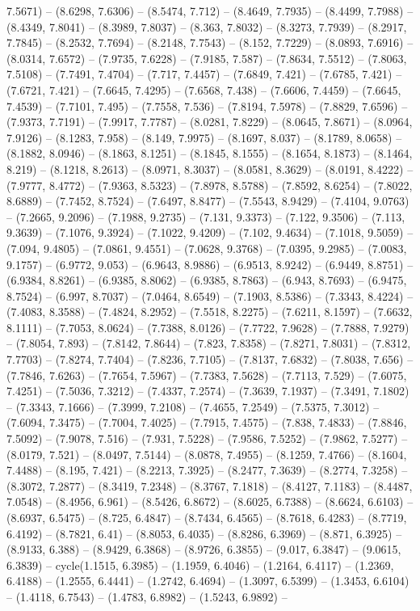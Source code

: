 7.5671) -- (8.6298, 7.6306) -- (8.5474, 7.712) -- (8.4649, 7.7935) -- (8.4499, 7.7988) -- (8.4349, 7.8041) -- (8.3989, 7.8037) -- (8.363, 7.8032) -- (8.3273, 7.7939) -- (8.2917, 7.7845) -- (8.2532, 7.7694) -- (8.2148, 7.7543) -- (8.152, 7.7229) -- (8.0893, 7.6916) -- (8.0314, 7.6572) -- (7.9735, 7.6228) -- (7.9185, 7.587) -- (7.8634, 7.5512) -- (7.8063, 7.5108) -- (7.7491, 7.4704) -- (7.717, 7.4457) -- (7.6849, 7.421) -- (7.6785, 7.421) -- (7.6721, 7.421) -- (7.6645, 7.4295) -- (7.6568, 7.438) -- (7.6606, 7.4459) -- (7.6645, 7.4539) -- (7.7101, 7.495) -- (7.7558, 7.536) -- (7.8194, 7.5978) -- (7.8829, 7.6596) -- (7.9373, 7.7191) -- (7.9917, 7.7787) -- (8.0281, 7.8229) -- (8.0645, 7.8671) -- (8.0964, 7.9126) -- (8.1283, 7.958) -- (8.149, 7.9975) -- (8.1697, 8.037) -- (8.1789, 8.0658) -- (8.1882, 8.0946) -- (8.1863, 8.1251) -- (8.1845, 8.1555) -- (8.1654, 8.1873) -- (8.1464, 8.219) -- (8.1218, 8.2613) -- (8.0971, 8.3037) -- (8.0581, 8.3629) -- (8.0191, 8.4222) -- (7.9777, 8.4772) -- (7.9363, 8.5323) -- (7.8978, 8.5788) -- (7.8592, 8.6254) -- (7.8022, 8.6889) -- (7.7452, 8.7524) -- (7.6497, 8.8477) -- (7.5543, 8.9429) -- (7.4104, 9.0763) -- (7.2665, 9.2096) -- (7.1988, 9.2735) -- (7.131, 9.3373) -- (7.122, 9.3506) -- (7.113, 9.3639) -- (7.1076, 9.3924) -- (7.1022, 9.4209) -- (7.102, 9.4634) -- (7.1018, 9.5059) -- (7.094, 9.4805) -- (7.0861, 9.4551) -- (7.0628, 9.3768) -- (7.0395, 9.2985) -- (7.0083, 9.1757) -- (6.9772, 9.053) -- (6.9643, 8.9886) -- (6.9513, 8.9242) -- (6.9449, 8.8751) -- (6.9384, 8.8261) -- (6.9385, 8.8062) -- (6.9385, 8.7863) -- (6.943, 8.7693) -- (6.9475, 8.7524) -- (6.997, 8.7037) -- (7.0464, 8.6549) -- (7.1903, 8.5386) -- (7.3343, 8.4224) -- (7.4083, 8.3588) -- (7.4824, 8.2952) -- (7.5518, 8.2275) -- (7.6211, 8.1597) -- (7.6632, 8.1111) -- (7.7053, 8.0624) -- (7.7388, 8.0126) -- (7.7722, 7.9628) -- (7.7888, 7.9279) -- (7.8054, 7.893) -- (7.8142, 7.8644) -- (7.823, 7.8358) -- (7.8271, 7.8031) -- (7.8312, 7.7703) -- (7.8274, 7.7404) -- (7.8236, 7.7105) -- (7.8137, 7.6832) -- (7.8038, 7.656) -- (7.7846, 7.6263) -- (7.7654, 7.5967) -- (7.7383, 7.5628) -- (7.7113, 7.529) -- (7.6075, 7.4251) -- (7.5036, 7.3212) -- (7.4337, 7.2574) -- (7.3639, 7.1937) -- (7.3491, 7.1802) -- (7.3343, 7.1666) -- (7.3999, 7.2108) -- (7.4655, 7.2549) -- (7.5375, 7.3012) -- (7.6094, 7.3475) -- (7.7004, 7.4025) -- (7.7915, 7.4575) -- (7.838, 7.4833) -- (7.8846, 7.5092) -- (7.9078, 7.516) -- (7.931, 7.5228) -- (7.9586, 7.5252) -- (7.9862, 7.5277) -- (8.0179, 7.521) -- (8.0497, 7.5144) -- (8.0878, 7.4955) -- (8.1259, 7.4766) -- (8.1604, 7.4488) -- (8.195, 7.421) -- (8.2213, 7.3925) -- (8.2477, 7.3639) -- (8.2774, 7.3258) -- (8.3072, 7.2877) -- (8.3419, 7.2348) -- (8.3767, 7.1818) -- (8.4127, 7.1183) -- (8.4487, 7.0548) -- (8.4956, 6.961) -- (8.5426, 6.8672) -- (8.6025, 6.7388) -- (8.6624, 6.6103) -- (8.6937, 6.5475) -- (8.725, 6.4847) -- (8.7434, 6.4565) -- (8.7618, 6.4283) -- (8.7719, 6.4192) -- (8.7821, 6.41) -- (8.8053, 6.4035) -- (8.8286, 6.3969) -- (8.871, 6.3925) -- (8.9133, 6.388) -- (8.9429, 6.3868) -- (8.9726, 6.3855) -- (9.017, 6.3847) -- (9.0615, 6.3839) -- cycle(1.1515, 6.3985) -- (1.1959, 6.4046) -- (1.2164, 6.4117) -- (1.2369, 6.4188) -- (1.2555, 6.4441) -- (1.2742, 6.4694) -- (1.3097, 6.5399) -- (1.3453, 6.6104) -- (1.4118, 6.7543) -- (1.4783, 6.8982) -- (1.5243, 6.9892) -- 